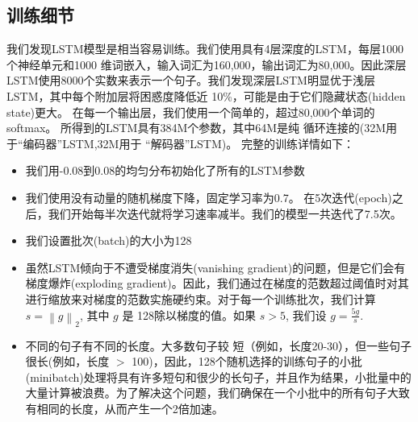 


\subsection{训练细节}

我们发现LSTM模型是相当容易训练。我们使用具有4层深度的LSTM，每层1000个神经单元和1000
维词嵌入，输入词汇为160,000，输出词汇为80,000。因此深层LSTM使用8000个实数来表示一个句子。我们发现深层LSTM明显优于浅层LSTM，其中每个附加层将困惑度降低近 10\%，可能是由于它们隐藏状态(hidden state)更大。  在每一个输出层，我们使用一个简单的，超过80,000个单词的softmax。
所得到的LSTM具有384M个参数，其中64M是纯
循环连接的(32M用于“编码器”LSTM,32M用于
``解码器''LSTM)。 完整的训练详情如下：

\begin{itemize}
\item 我们用-0.08到0.08的均匀分布初始化了所有的LSTM参数
\item 我们使用没有动量的随机梯度下降，固定学习率为0.7。 在5次迭代(epoch)之后，我们开始每半次迭代就将学习速率减半。我们的模型一共迭代了7.5次。
\item 我们设置批次(batch)的大小为128
\item 虽然LSTM倾向于不遭受梯度消失(vanishing gradient)的问题，但是它们会有梯度爆炸(exploding gradient)。因此，我们通过在梯度的范数超过阈值时对其进行缩放来对梯度的范数实施硬约束\cite{graves13c,razvan}。对于每一个训练批次，我们计算 $s =
  \left\|g\right\|_2$, 其中 $g$ 是 128除以梯度的值。如果 $s > 5$, 我们设
  $g = \frac{5g}{s}$.
\item 不同的句子有不同的长度。大多数句子较
短（例如，长度20-30），但一些句子很长(例如，长度
  $>$ 100)，因此，128个随机选择的训练句子的小批(minibatch)处理将具有许多短句和很少的长句子，并且作为结果，小批量中的大量计算被浪费。为了解决这个问题，我们确保在一个小批中的所有句子大致有相同的长度，从而产生一个2倍加速。
\end{itemize}


